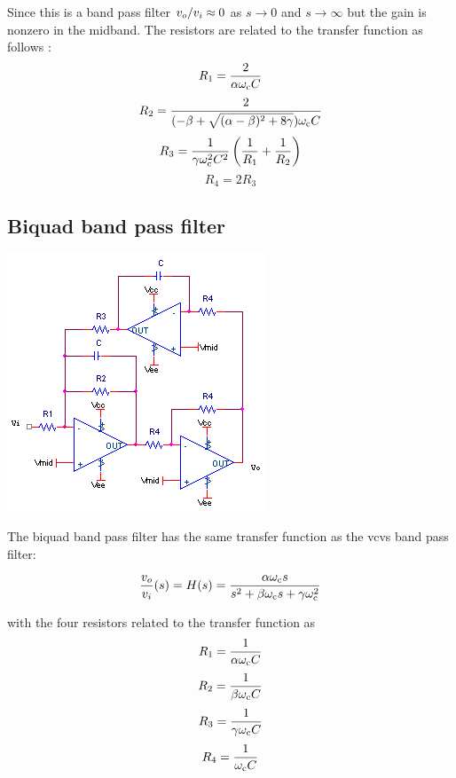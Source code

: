 Since this is a band pass filter $\vout/\vin \approx 0$ as $s \to 0$ and $s \to \infty$ but the gain is nonzero in the midband.
The resistors are related to the transfer function as follows \autocite[138-139]{op-amp-circuits-johnson}:
\begin{equation}
R_1 = \frac{2}{\alpha \omega_\mathrm{c} C}
\end{equation}
\begin{equation}
R_2 = \frac{2}{(-\beta+\sqrt{(\alpha - \beta)^2 + 8\gamma})\omega_\mathrm{c} C}
\end{equation}
\begin{equation}
R_3 = \frac{1}{\gamma \omega_\mathrm{c}^2 C^2}\left(\frac{1}{R_1} + \frac{1}{R_2}\right)
\end{equation}
\begin{equation}
R_4 = 2R_3
\end{equation}

\subsection{Biquad band pass filter}
\begin{center}
	\includegraphics{schematics/biquad_bandpass.PNG}
\end{center}
The biquad band pass filter has the same transfer function as the \ac{vcvs} band pass filter:

\textcolor{red}{
\begin{equation}
\frac{\vout}{\vin}(s) = \Hs = \frac{\alpha \wcutoff s}{s^2 + \beta\wcutoff s + \gamma \wcutoff^2}
\label{eq:biquad_bandpass}
\end{equation}
}

with the four resistors related to the transfer function as
\begin{equation}
R_1 = \frac{1}{\alpha \omega_\mathrm{c} C}
\end{equation}
\begin{equation}
R_2 = \frac{1}{\beta \omega_\mathrm{c} C}
\end{equation}
\begin{equation}
R_3 = \frac{1}{\gamma \omega_\mathrm{c} C}
\end{equation}
\begin{equation}
R_4 = \frac{1}{\omega_\mathrm{c} C}
\end{equation}

